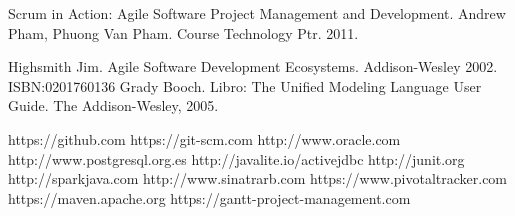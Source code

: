 \begin{thebibliography}{10}
Scrum in Action: Agile Software Project Management and Development. Andrew Pham, Phuong Van Pham. Course Technology Ptr. 2011.

 Highsmith Jim. Agile Software Development Ecosystems. Addison-Wesley 2002. ISBN:0201760136
 Grady Booch. Libro: The Unified Modeling Language User Guide. The Addison-Wesley, 2005.


 https://github.com
 https://git-scm.com
 http://www.oracle.com
 http://www.postgresql.org.es
 http://javalite.io/activejdbc
 http://junit.org
 http://sparkjava.com
 http://www.sinatrarb.com
 https://www.pivotaltracker.com
https://maven.apache.org
 https://gantt-project-management.com



\end{thebibliography}